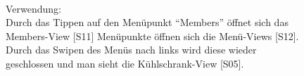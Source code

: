 \documentclass[a4paper]{scrreprt}
\begin{document}
\begin{figure}[h]
\begin{minipage}[b]{0.55\linewidth}
\begin{itemize}
    			\end{itemize}
    		
	    		\hfill
	    		\\
    			
    			Verwendung:\\
    			Durch das Tippen auf den Menüpunkt
    			``Members” öffnet sich das Members-View {[}S11{]}
    			Menüpunkte öffnen sich die Menü-Views {[}S12{]}.\\ Durch das Swipen des Menüs nach links wird diese wieder geschlossen und man sieht die Kühlschrank-View {[}S05{]}.
    			
    			\vspace{1mm}
    			
    		\end{minipage}
    	\end{figure}
    	
\end{document}
